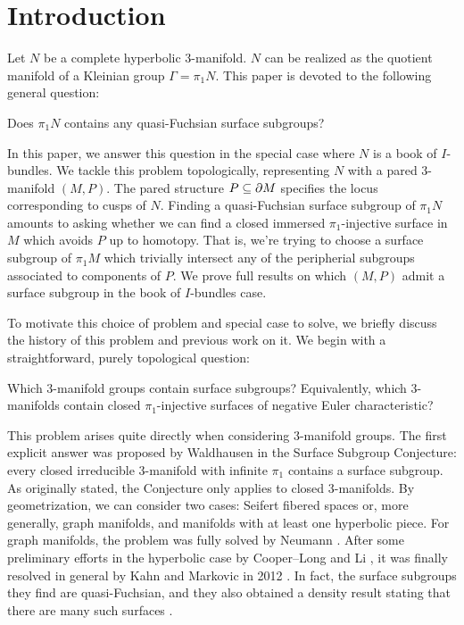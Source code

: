 \section{Introduction}

Let $N$ be a complete hyperbolic $3$-manifold. $N$ can be realized as the
quotient manifold of a Kleinian group $\Gamma=\pi_1N$. This paper is devoted to
the following general question:

\begin{prob}

Does $\pi_1N$ contains any quasi-Fuchsian surface subgroups?

\end{prob}

In this paper, we answer this question in the special case where $N$ is a book
of $I$-bundles. We tackle this problem topologically, representing $N$ with
a pared $3$-manifold $(M,P)$.  The pared structure $P\subseteq\partial M$ specifies the
locus corresponding to cusps of $N$. Finding a quasi-Fuchsian surface subgroup
of $\pi_1N$ amounts to asking whether we can find a closed immersed
$\pi_1$-injective surface in $M$ which avoids $P$ up to homotopy.  That is,
we're trying to choose a surface subgroup of $\pi_1M$ which trivially intersect
any of the peripherial subgroups associated to components of $P$. We prove full
results on which $(M,P)$ admit a surface subgroup in the book of $I$-bundles
case.

To motivate this choice of problem and special case to solve, we briefly
discuss the history of this problem and previous work on it. We begin with
a straightforward, purely topological question:

\begin{prob}

Which $3$-manifold groups contain surface subgroups? Equivalently, which
$3$-manifolds contain closed $\pi_1$-injective surfaces of negative Euler
characteristic?

\end{prob}

This problem arises quite directly when considering $3$-manifold groups. The
first explicit answer was proposed by Waldhausen \cite{Kirby} in
the Surface Subgroup Conjecture: every closed irreducible $3$-manifold with
infinite $\pi_1$ contains a surface subgroup. As originally stated, the
Conjecture only applies to closed $3$-manifolds. By geometrization, we can
consider two cases: Seifert fibered spaces or, more generally, graph manifolds,
and manifolds with at least one hyperbolic piece. For graph manifolds, the
problem was fully solved by Neumann \cite{Neu}.  After some preliminary
efforts in the hyperbolic case by Cooper--Long \cite{CooperLong} and Li
\cite{Li}, it was finally resolved in general by Kahn and Markovic in
2012 \cite{KM}.  In fact, the surface subgroups they find are quasi-Fuchsian,
and they also obtained a density result stating that there are many such
surfaces \cite{KM2}.

